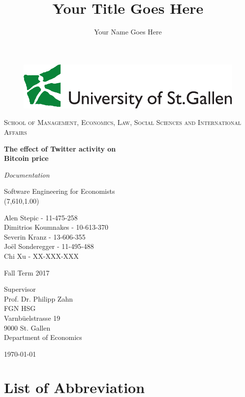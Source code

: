 \documentclass[a4paper,12pt]{article}
\title{Your Title Goes Here}
\author{Your Name Goes Here}
\begin{document}
\begin{titlepage}
	\begin{figure}
	\centering
	\includegraphics[scale=0.32]{logohsg}
	\end{figure}
\centering
\centering
{\scshape\large School of Management, Economics, Law, Social Sciences and International Affairs \par}
\vspace{1.7cm}
{\huge\bfseries The effect of Twitter activity on \\ Bitcoin price\par}
\vspace{1.0cm}
{\Huge\itshape Documentation\par}
\vspace{1.0cm}     
{\Large Software Engineering for Economists \\ (7,610,1.00) \par}
\vspace{1.2cm}
{Alen Stepic - 11-475-258 \\ Dimitrios Koumnakes - 10-613-370 \\ Severin Kranz - 13-606-355 \\ Joël Sonderegger - 11-495-488 \\ Chi Xu - XX-XXX-XXX \par}
\vspace{1.2cm}
Fall Term 2017 \\
\vspace{1.2cm}
{Supervisor\\ Prof. Dr. Philipp Zahn\\ FGN HSG\\ Varnbüelstrasse 19\\ 9000 St. Gallen\\ Department of Economics\par}
\vspace{0.8cm}
{\centering\today\par}
\end{titlepage}

\clearpage

\tableofcontents

\clearpage
    
\listoffigures\bigskip 
\section*{List of Abbreviation} 
\begin{acronym}[ASECRETTT]
\end{acronym}
\end{document}
